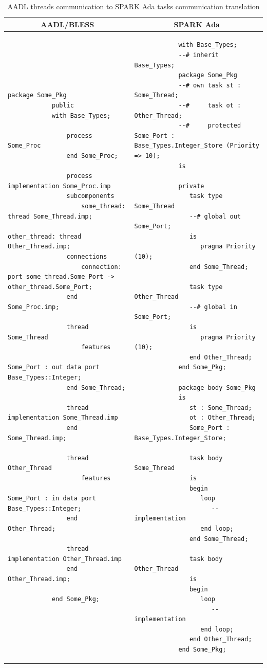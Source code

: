 \begin{table}[!ht]
	\caption{AADL threads communication to SPARK Ada tasks communication translation}
	\label{table:port_communication_thread}
	\singlespacing
	\centering
  	\begin{tabular}{ | p{3in} | p{3in} |}

		\hline
		\multicolumn{1}{|c|}{\textbf{AADL/BLESS}} & \multicolumn{1}{|c|}{\textbf{SPARK Ada}} \\ \hline

		\begin{lstlisting}[language=aadl]
			package Some_Pkg
			public
			with Base_Types;

				process Some_Proc
				end Some_Proc;
				
				process implementation Some_Proc.imp
				subcomponents
					some_thread: thread Some_Thread.imp;
					other_thread: thread Other_Thread.imp;
				connections
					connection: port some_thread.Some_Port -> other_thread.Some_Port;
				end Some_Proc.imp;

				thread Some_Thread
					features
						Some_Port : out data port Base_Types::Integer;
				end Some_Thread;

				thread implementation Some_Thread.imp
				end Some_Thread.imp;
				
				thread Other_Thread
					features
						Some_Port : in data port Base_Types::Integer;
				end Other_Thread;

				thread implementation Other_Thread.imp
				end Other_Thread.imp;
							
			end Some_Pkg;
		\end{lstlisting} 
		& 
		\begin{lstlisting}
			with Base_Types;
			--# inherit Base_Types;
			package Some_Pkg
			--# own task st : Some_Thread;
			--#     task ot : Other_Thread;
			--#     protected Some_Port : Base_Types.Integer_Store (Priority => 10);
			is
			   
			private   
			   task type Some_Thread     
			   --# global out Some_Port;   
			   is
			      pragma Priority (10);
			   end Some_Thread;
			   
			   task type Other_Thread
			   --# global in Some_Port;
			   is      
			      pragma Priority (10);      
			   end Other_Thread;	   
			end Some_Pkg;

			package body Some_Pkg
			is
			   st : Some_Thread;
			   ot : Other_Thread;
			   Some_Port : Base_Types.Integer_Store;

			   task body Some_Thread
			   is   
			   begin      
			      loop         
			         -- implementation
			      end loop;      
			   end Some_Thread;
			   
			   task body Other_Thread
			   is
			   begin      
			      loop
			         -- implementation       
			      end loop;      
			   end Other_Thread;   
			end Some_Pkg;	
		\end{lstlisting} 		

		\\ \hline
	\end{tabular}
\end{table}
\doublespacing

